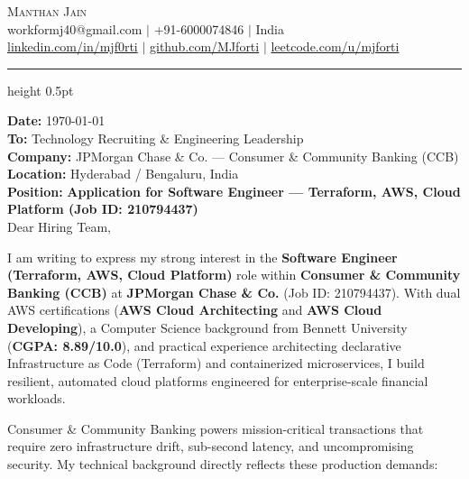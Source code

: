 \documentclass[letterpaper,10pt]{article}
\begin{document}
\begin{center}
  {\Huge \scshape Manthan Jain} \\[6pt]
  \small 
  workformj40@gmail.com \hspace{8pt}$|$\hspace{8pt} +91-6000074846 \hspace{8pt}$|$\hspace{8pt} India \\[3pt]
  \href{https://www.linkedin.com/in/mjf0rti}{linkedin.com/in/mjf0rti} \hspace{8pt}$|$\hspace{8pt} \href{https://github.com/MJforti}{github.com/MJforti} \hspace{8pt}$|$\hspace{8pt} \href{https://leetcode.com/u/mjforti_/}{leetcode.com/u/mjforti}
\end{center}

\vspace{-6pt}
\hrule height 0.5pt
\vspace{8pt}

\small
\textbf{Date:} \today \\[3pt]
\textbf{To:} Technology Recruiting \& Engineering Leadership \\
\textbf{Company:} JPMorgan Chase \& Co. --- Consumer \& Community Banking (CCB) \\
\textbf{Location:} Hyderabad / Bengaluru, India \\
\textbf{Position:} \textbf{Application for Software Engineer --- Terraform, AWS, Cloud Platform (Job ID: 210794437)} \\[6pt]

Dear Hiring Team,

\vspace{3pt}
I am writing to express my strong interest in the \textbf{Software Engineer (Terraform, AWS, Cloud Platform)} role within \textbf{Consumer \& Community Banking (CCB)} at \textbf{JPMorgan Chase \& Co.} (Job ID: 210794437). With dual AWS certifications (\textbf{AWS Cloud Architecting} and \textbf{AWS Cloud Developing}), a Computer Science background from Bennett University (\textbf{CGPA: 8.89/10.0}), and practical experience architecting declarative Infrastructure as Code (Terraform) and containerized microservices, I build resilient, automated cloud platforms engineered for enterprise-scale financial workloads.

Consumer \& Community Banking powers mission-critical transactions that require zero infrastructure drift, sub-second latency, and uncompromising security. My technical background directly reflects these production demands:
\end{document}
